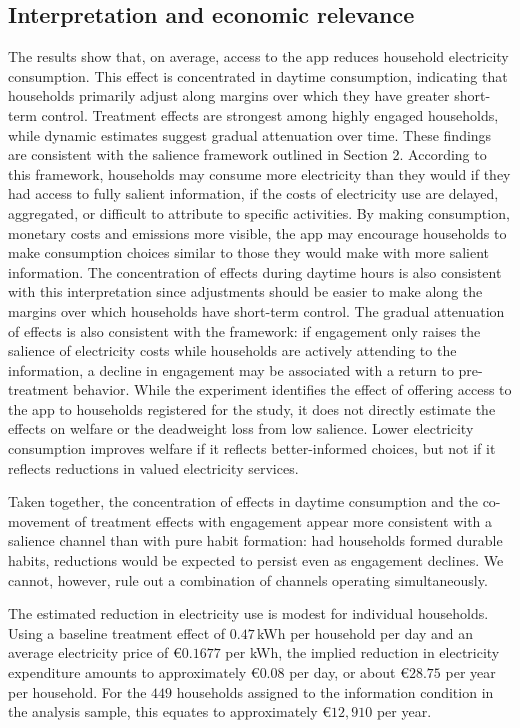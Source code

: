 \subsection{Interpretation and economic relevance}

The results show that, on average, access to the app reduces household electricity consumption. This effect is concentrated in daytime consumption, indicating that households primarily adjust along margins over which they have greater short-term control. Treatment effects are strongest among highly engaged households, while dynamic estimates suggest gradual attenuation over time. These findings are consistent with the salience framework outlined in Section 2. According to this framework, households may consume more electricity than they would if they had access to fully salient information, if the costs of electricity use are delayed, aggregated, or difficult to attribute to specific activities. By making consumption, monetary costs and emissions more visible, the app may encourage households to make consumption choices similar to those they would make with more salient information. The concentration of effects during daytime hours is also consistent with this interpretation since adjustments should be easier to make along the margins over which households have short-term control. The gradual attenuation of effects is also consistent with the framework: if engagement only raises the salience of electricity costs while households are actively attending to the information, a decline in engagement may be associated with a return to pre-treatment behavior. While the experiment identifies the effect of offering access to the app to households registered for the study, it does not directly estimate the effects on welfare or the deadweight loss from low salience. Lower electricity consumption improves welfare if it reflects better-informed choices, but not if it reflects reductions in valued electricity services.

Taken together, the concentration of effects in daytime consumption and the co-movement of treatment effects with engagement appear more consistent with a salience channel than with pure habit formation: had households formed durable habits, reductions would be expected to persist even as engagement declines. We cannot, however, rule out a combination of channels operating simultaneously.

The estimated reduction in electricity use is modest for individual households. Using a baseline treatment effect of $0.47$\,kWh per household per day and an average electricity price of \euro{}$0.1677$ per kWh, the implied reduction in electricity expenditure amounts to approximately \euro{}$0.08$ per day, or about \euro{}$28.75$ per year per household. For the $449$ households assigned to the information condition in the analysis sample, this equates to approximately \euro{}$12{,}910$ per year. 

